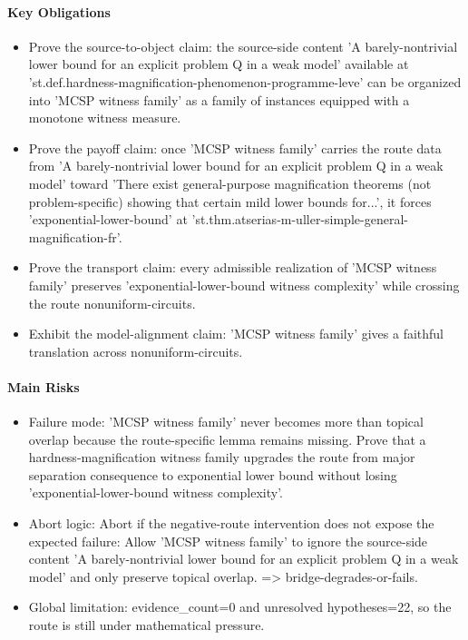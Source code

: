 \documentclass[11pt]{article}
\begin{document}
\paragraph{Key Obligations}
\begin{itemize}[leftmargin=*,itemsep=0.2em]
\item Prove the source-to-object claim: the source-side content 'A barely-nontrivial lower bound for an explicit problem Q in a weak model' available at 'st.def.hardness-magnification-phenomenon-programme-leve' can be organized into 'MCSP witness family' as a family of instances equipped with a monotone witness measure.
\item Prove the payoff claim: once 'MCSP witness family' carries the route data from 'A barely-nontrivial lower bound for an explicit problem Q in a weak model' toward 'There exist general-purpose magnification theorems (not problem-specific) showing that certain mild lower bounds for...', it forces 'exponential-lower-bound' at 'st.thm.atserias-m-uller-simple-general-magnification-fr'.
\item Prove the transport claim: every admissible realization of 'MCSP witness family' preserves 'exponential-lower-bound witness complexity' while crossing the route nonuniform-circuits.
\item Exhibit the model-alignment claim: 'MCSP witness family' gives a faithful translation across nonuniform-circuits.
\end{itemize}
\paragraph{Main Risks}
\begin{itemize}[leftmargin=*,itemsep=0.2em]
\item Failure mode: 'MCSP witness family' never becomes more than topical overlap because the route-specific lemma remains missing. Prove that a hardness-magnification witness family upgrades the route from major separation consequence to exponential lower bound without losing 'exponential-lower-bound witness complexity'.
\item Abort logic: Abort if the negative-route intervention does not expose the expected failure: Allow 'MCSP witness family' to ignore the source-side content 'A barely-nontrivial lower bound for an explicit problem Q in a weak model' and only preserve topical overlap. => bridge-degrades-or-fails.
\item Global limitation: evidence\_count=0 and unresolved hypotheses=22, so the route is still under mathematical pressure.
\end{itemize}
\end{document}
